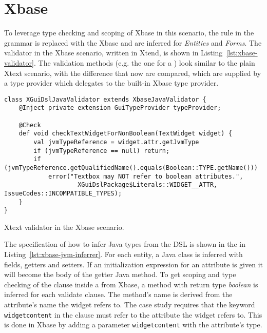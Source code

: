 \section{Xbase}
\label{sec:xbase}

To leverage type checking and scoping of Xbase in this scenario, the
 rule in the grammar is replaced with the Xbase
 and  are inferred for \emph{Entities} and
\emph{Forms}.
The validator in the Xbase scenario, written in Xtend, is shown in
Listing~\ref{lst:xbase-validator}. The validation methods (e.g. the one for a
) look similar to the plain Xtext scenario, with the difference
that now  are compared, which are supplied by a type provider
which delegates to the built-in Xbase type provider.


\begin{listing}[tb]
\begin{lstlisting}[language=xtend] 
class XGuiDslJavaValidator extends XbaseJavaValidator {
	@Inject private extension GuiTypeProvider typeProvider;

	@Check
	def void checkTextWidgetForNonBoolean(TextWidget widget) {
		val jvmTypeReference = widget.attr.getJvmType
		if (jvmTypeReference == null) return;
		if (jvmTypeReference.getQualifiedName().equals(Boolean::TYPE.getName()))
			error("Textbox may NOT refer to boolean attributes.",
					XGuiDslPackage$Literals::WIDGET__ATTR, IssueCodes::INCOMPATIBLE_TYPES);
	}
}
\end{lstlisting}
\caption{Xtext validator in the Xbase scenario.}
\label{lst:xbase-validator}
\end{listing}

The specification of how to infer Java types from the DSL is shown in the
 in Listing~\ref{lst:xbase-jvm-inferrer}.  For each
entity, a Java class is inferred with fields, getters and setters.
If an initialization expression for an attribute is given it will become the
body of the getter Java method.  To get scoping and type checking of the
 clause inside a  from Xbase, a method with return type \emph{boolean} is inferred for
each validate clause. The method's name is derived from the attribute's name the
widget refers to. The case study requires that the keyword \verb|widgetcontent|
in the  clause must refer to the attribute the widget refers to.
This is done in Xbase by adding a parameter \verb|widgetcontent| with the
attribute's type.

